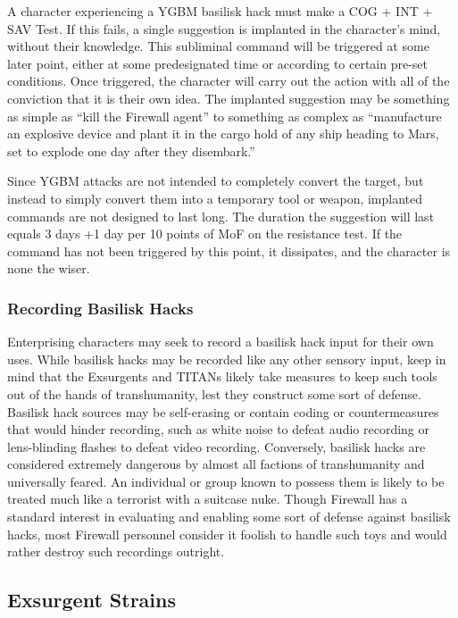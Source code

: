 A character experiencing a YGBM basilisk hack must make a COG + INT + SAV Test. If this fails, a single suggestion is implanted in the character's mind, without their knowledge. This subliminal command will be triggered at some later point, either at some predesignated time or according to certain pre-set conditions. Once triggered, the character will carry out the action with all of the conviction that it is their own idea. The implanted suggestion may be something as simple as ``kill the Firewall agent'' to something as complex as ``manufacture an explosive device and plant it in the cargo hold of any ship heading to Mars, set to explode one day after they disembark.'' 

Since YGBM attacks are not intended to completely convert the target, but instead to simply convert them into a temporary tool or weapon, implanted commands are not designed to last long. The duration the suggestion will last equals 3 days +1 day per 10 points of MoF on the resistance test. If the command has not been triggered by this point, it dissipates, and the character is none the wiser. 

\subsubsection{Recording Basilisk Hacks} 

Enterprising characters may seek to record a basilisk hack input for their own uses. While basilisk hacks may be recorded like any other sensory input, keep in mind that the Exsurgents and TITANs likely take measures to keep such tools out of the hands of transhumanity, lest they construct some sort of defense. Basilisk hack sources may be self-erasing or contain coding or countermeasures that would hinder recording, such as white noise to defeat audio recording or lens-blinding flashes to defeat video recording. Conversely, basilisk hacks are considered extremely dangerous by almost all factions of transhumanity and universally feared. An individual or group known to possess them is likely to be treated much like a terrorist with a suitcase nuke. Though Firewall has a standard interest in evaluating and enabling some sort of defense against basilisk hacks, most Firewall personnel consider it foolish to handle such toys and would rather destroy such recordings outright. 

\subsection{Exsurgent Strains} 

